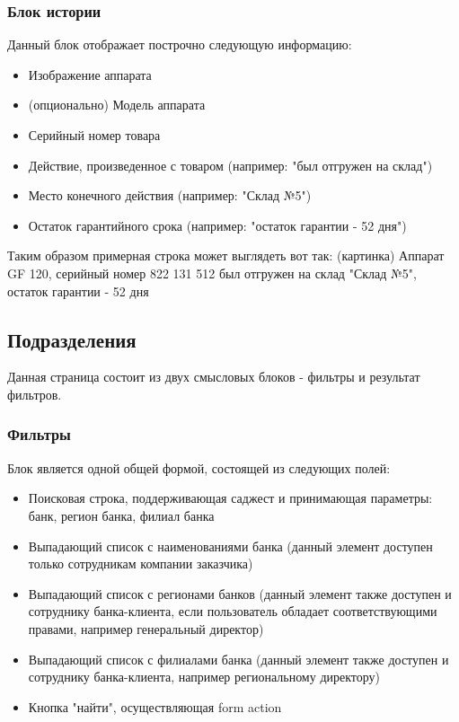 \documentclass[DIV=calc, paper=a4, fontsize=11pt]{scrartcl} %
\begin{document}
\subsubsection{Блок истории}
Данный блок отображает построчно следующую информацию:
\begin{itemize}
	\item Изображение аппарата
	\item (опционально) Модель аппарата
	\item Серийный номер товара
	\item Действие, произведенное с товаром (например: "был отгружен на склад")
	\item Место конечного действия (например: "Склад №5")
	\item Остаток гарантийного срока (например: "остаток гарантии - 52 дня")
\end{itemize}

Таким образом примерная строка может выглядеть вот так:
(картинка) Аппарат GF 120, серийный номер 822 131 512 был отгружен на склад "Склад №5", остаток гарантии - 52 дня

\subsection{Подразделения}
Данная страница состоит из двух смысловых блоков - фильтры и результат фильтров.

\subsubsection{Фильтры}
Блок является одной общей формой, состоящей из следующих полей:
\begin{itemize}
	\item Поисковая строка, поддерживающая саджест и принимающая параметры: банк, регион банка, филиал банка
	\item Выпадающий список с наименованиями банка (данный элемент доступен только сотрудникам компании заказчика)
	\item Выпадающий список с регионами банков (данный элемент также доступен и сотруднику банка-клиента, если пользователь обладает соответствующими правами, например генеральный директор)
	\item Выпадающий список с филиалами банка (данный элемент также доступен и сотруднику банка-клиента, например региональному директору)
	\item Кнопка "найти", осуществляющая form action 
\end{itemize}
\end{document}
